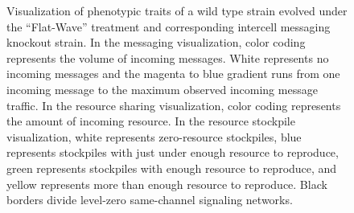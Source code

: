 \begin{figure}[!htbp]
\begin{center}
\caption{
Visualization of phenotypic traits of a wild type strain evolved under the ``Flat-Wave'' treatment and corresponding intercell messaging knockout strain.
In the messaging visualization, color coding represents the volume of incoming messages.
White represents no incoming messages and the magenta to blue gradient runs from one incoming message to the maximum observed incoming message traffic.
In the resource sharing visualization, color coding represents the amount of incoming resource.
In the resource stockpile visualization, white represents zero-resource stockpiles, blue represents stockpiles with just under enough resource to reproduce, green represents stockpiles with enough resource to reproduce, and yellow represents more than enough resource to reproduce.
Black borders divide level-zero same-channel signaling networks.
}
\label{fig:ko-intermessaging-sharing}
\end{center}
\end{figure}
